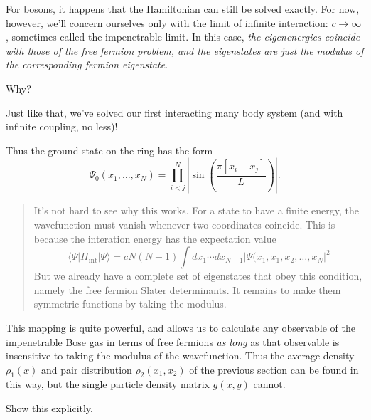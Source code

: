 \documentclass[
  letterpaper,
  DIV=11,
  numbers=noendperiod]{scrreprt}
\begin{document}
For bosons, it happens that the Hamiltonian can still be solved exactly.
For now, however, we'll concern ourselves only with the limit of
infinite interaction: \(c\to \infty\), sometimes called the impenetrable
limit. In this case, \emph{the eigenenergies coincide with those of the
free fermion problem, and the eigenstates are just the modulus of the
corresponding fermion eigenstate}.

\begin{tcolorbox}[enhanced jigsaw, colback=white, bottomrule=.15mm, left=2mm, colbacktitle=quarto-callout-tip-color!10!white, breakable, colframe=quarto-callout-tip-color-frame, leftrule=.75mm, opacitybacktitle=0.6, opacityback=0, bottomtitle=1mm, toptitle=1mm, titlerule=0mm, title=\textcolor{quarto-callout-tip-color}{\faLightbulb}\hspace{0.5em}{Check}, toprule=.15mm, arc=.35mm, coltitle=black, rightrule=.15mm]

Why?

\end{tcolorbox}

Just like that, we've solved our first interacting many body system (and
with infinite coupling, no less)!

Thus the ground state on the ring has the form \[
\Psi_0(x_1,\ldots, x_N) = \prod_{i<j}^{N} \left|\sin\left(\frac{\pi[x_{i}-x_{j}]}{L}\right)\right|.
\]

\begin{quote}
It's not hard to see why this works. For a state to have a finite
energy, the wavefunction must vanish whenever two coordinates coincide.
This is because the interation energy has the expectation value \[
\langle{\Psi}\rvert H_\text{int} \lvert \Psi \rangle=cN(N-1)\int dx_1\cdots dx_{N-1}\left|
\Psi(x_1,x_1,x_2,\ldots,x_N\right|^2
\] But we already have a complete set of eigenstates that obey this
condition, namely the free fermion Slater determinants. It remains to
make them symmetric functions by taking the modulus.
\end{quote}

This mapping is quite powerful, and allows us to calculate any
observable of the impenetrable Bose gas in terms of free fermions
\emph{as long} as that observable is insensitive to taking the modulus
of the wavefunction. Thus the average density \(\rho_1(x)\) and pair
distribution \(\rho_2(x_1,x_2)\) of the previous section can be found in
this way, but the single particle density matrix \(g(x,y)\) cannot.

\begin{tcolorbox}[enhanced jigsaw, colback=white, bottomrule=.15mm, left=2mm, colbacktitle=quarto-callout-tip-color!10!white, breakable, colframe=quarto-callout-tip-color-frame, leftrule=.75mm, opacitybacktitle=0.6, opacityback=0, bottomtitle=1mm, toptitle=1mm, titlerule=0mm, title=\textcolor{quarto-callout-tip-color}{\faLightbulb}\hspace{0.5em}{Check}, toprule=.15mm, arc=.35mm, coltitle=black, rightrule=.15mm]

Show this explicitly.

\end{tcolorbox}
\end{document}
